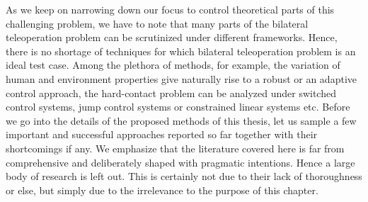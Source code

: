 As we keep on narrowing down our focus to control theoretical parts of this challenging problem, we have to 
note that many parts of the bilateral teleoperation problem can be scrutinized under different frameworks. 
Hence, there is no shortage of techniques for which bilateral teleoperation problem is an ideal 
test case. Among the plethora of methods, for example, the variation of human and environment properties give 
naturally rise to a robust or an adaptive control approach, the hard-contact problem can be analyzed under 
switched control systems, jump control systems or constrained linear systems etc. Before we go into the 
details of the proposed methods of this thesis, let us sample a few important and successful approaches 
reported so far together with their shortcomings if any. We emphasize that the literature covered here is 
far from comprehensive and deliberately shaped with pragmatic intentions. Hence a large body of research is 
left out. This is certainly not due to their lack of thoroughness or else, but simply due to the irrelevance 
to the purpose of this chapter.


